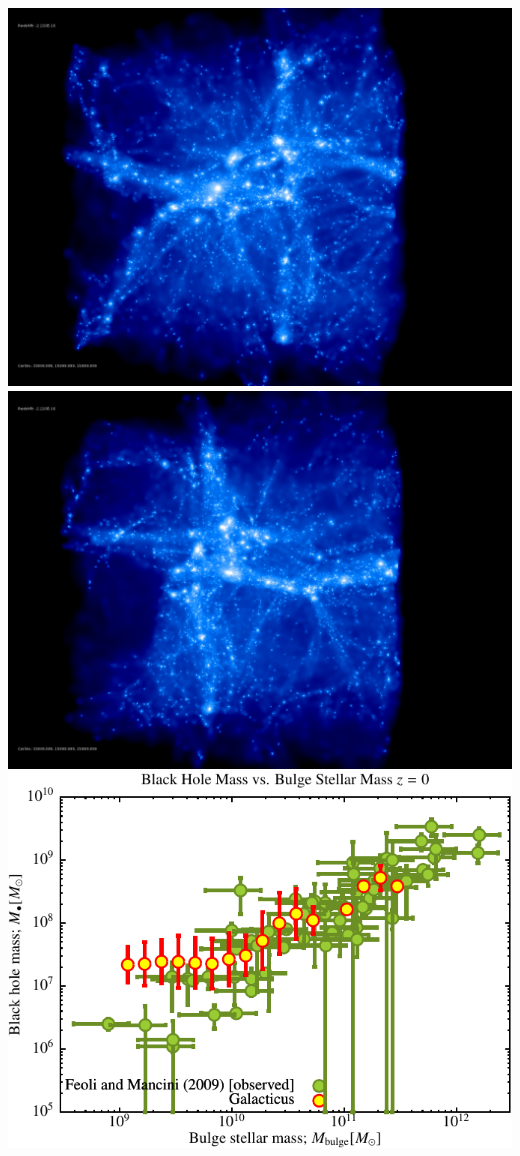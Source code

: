 \documentclass[a4paper,11pt,fleqn,oneside]{book}
\begin{document}
\includegraphics[scale=0.12]{drd5_r256/rotate_00185.jpg} 
\includegraphics[scale=0.12]{drd5_r256/rotate_00136.jpg} 
\includegraphics[scale=0.6]{drd5_r256/Black_Hole_vs_Bulge_Mass.pdf}
\end{document}
